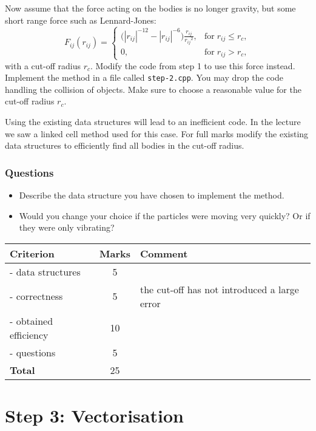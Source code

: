 \documentclass[11pt,a4paper,DIV=12,pdftex]{scrartcl}
\begin{document}
Now assume that the force acting on the bodies is no longer gravity, but some short range force such as Lennard-Jones:
  \begin{equation}
   F_{ij}\left(r_{ij}\right)=
   \begin{cases}
      \bigl(|r_{ij}|^{-12}- |r_{ij}|^{-6} \bigr) \frac{r_{ij}}{{r_{ij}}^2}, & \text{for}\; r_{ij} \le r_c,\\
    0, & \text{for}\; r_{ij} > r_c,
   \end{cases}
  \end{equation}
with a cut-off radius $r_c$.
Modify the code from step 1 to use this force instead.  Implement the method in a file called \verb#step-2.cpp#. You may drop the code handling the collision of objects.
 Make sure to choose a reasonable value for the cut-off radius $r_c$.

 Using the existing data structures will lead to an inefficient code.
 In the lecture we saw a linked cell method used for this case. For full marks modify the existing data structures to efficiently find all bodies in the cut-off radius.
 
\subsubsection*{Questions}
\begin{itemize}
 \item Describe the data structure you have chosen to implement the method.
 \item Would you change your choice if the particles were moving very quickly? Or if they were only vibrating?
\end{itemize}

\begin{table}[h]
\centering
 \begin{tabular}{|l|c|p{7cm}|}
 \hline
 \textbf{Criterion} & \textbf{Marks} &\textbf{Comment}\\
\hline
- data structures & 5 & \\
- correctness & 5 & the cut-off has not introduced a large error\\
- obtained efficiency & 10 &\\
- questions & 5 &\\
    \hline
\textbf{Total} & 25 & \\
 \hline
 \end{tabular}
\end{table}

\section*{Step 3: Vectorisation}
\end{document}
